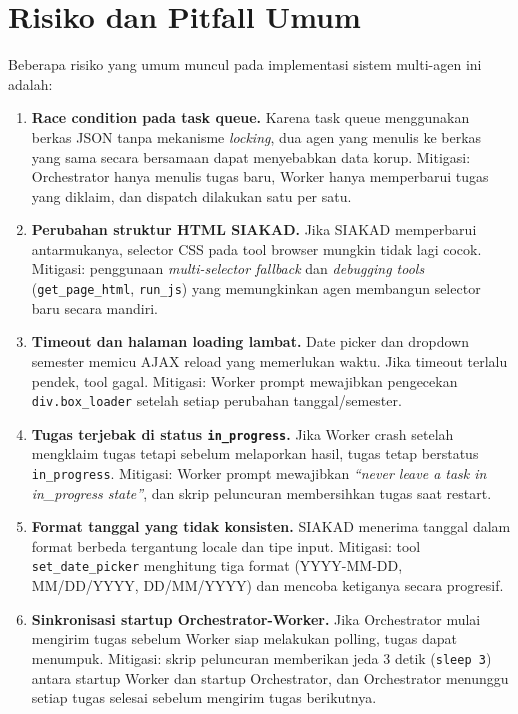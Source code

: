 \section{Risiko dan Pitfall Umum}

Beberapa risiko yang umum muncul pada implementasi sistem multi-agen ini adalah:
\begin{enumerate}
  \item \textbf{Race condition pada task queue.} Karena task queue menggunakan berkas JSON tanpa mekanisme \textit{locking}, dua agen yang menulis ke berkas yang sama secara bersamaan dapat menyebabkan data korup. Mitigasi: Orchestrator hanya menulis tugas baru, Worker hanya memperbarui tugas yang diklaim, dan dispatch dilakukan satu per satu.

  \item \textbf{Perubahan struktur HTML SIAKAD.} Jika SIAKAD memperbarui antarmukanya, selector CSS pada tool browser mungkin tidak lagi cocok. Mitigasi: penggunaan \textit{multi-selector fallback} dan \textit{debugging tools} (\texttt{get\_page\_html}, \texttt{run\_js}) yang memungkinkan agen membangun selector baru secara mandiri.

  \item \textbf{Timeout dan halaman loading lambat.} Date picker dan dropdown semester memicu AJAX reload yang memerlukan waktu. Jika timeout terlalu pendek, tool gagal. Mitigasi: Worker prompt mewajibkan pengecekan \texttt{div.box\_loader} setelah setiap perubahan tanggal/semester.

  \item \textbf{Tugas terjebak di status \texttt{in\_progress}.} Jika Worker crash setelah mengklaim tugas tetapi sebelum melaporkan hasil, tugas tetap berstatus \texttt{in\_progress}. Mitigasi: Worker prompt mewajibkan \textit{``never leave a task in in\_progress state''}, dan skrip peluncuran membersihkan tugas saat restart.

  \item \textbf{Format tanggal yang tidak konsisten.} SIAKAD menerima tanggal dalam format berbeda tergantung locale dan tipe input. Mitigasi: tool \texttt{set\_date\_picker} menghitung tiga format (YYYY-MM-DD, MM/DD/YYYY, DD/MM/YYYY) dan mencoba ketiganya secara progresif.

  \item \textbf{Sinkronisasi startup Orchestrator-Worker.} Jika Orchestrator mulai mengirim tugas sebelum Worker siap melakukan polling, tugas dapat menumpuk. Mitigasi: skrip peluncuran memberikan jeda 3 detik (\texttt{sleep 3}) antara startup Worker dan startup Orchestrator, dan Orchestrator menunggu setiap tugas selesai sebelum mengirim tugas berikutnya.
\end{enumerate}

